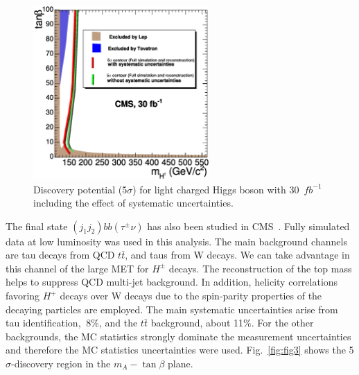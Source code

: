 \documentclass{cimento}
\begin{document}
\begin{figure}
\centering
\includegraphics[width=0.6\textwidth]{fig02.ps}

\caption{Discovery potential (5$\sigma$) for light charged Higgs boson with
30~$fb^{-1}$ including the effect of systematic uncertainties.}
\label{fig:fig2}
\end{figure}

 
The final state $(j_{1}j_{2})bb(\tau^{\pm}\nu)$ has also been studied in 
CMS~\cite{ref:jjtauAna}. Fully
simulated data at low luminosity was used in this analysis. The main background
channels are tau decays from QCD $t\bar{t}$, and taus from W decays. We can take 
advantage in this channel of the large MET for $H^{\pm}$ decays. The reconstruction
of the top mass helps to suppress QCD multi-jet background. In addition, helicity
correlations favoring $H^{+}$ decays over W decays due to the spin-parity
properties of the decaying particles are employed. The main systematic uncertainties arise from
tau identification, $~8$\%, and the $t\bar{t}$ background, about 11\%. For the
other backgrounds, the MC statistics strongly dominate the measurement uncertainties
and therefore the MC statistics uncertainties were used. Fig.~\ref{fig:fig3} shows
the 5$\sigma$-discovery region in the $m_{A}-\tan \beta$ plane.
\end{document}
